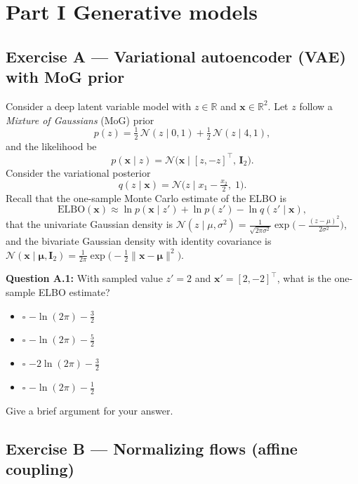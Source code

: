 \documentclass[12pt,a4paper]{article}
\newcommand{\N}{\mathcal{N}}
\newcommand{\ELBO}{\mathrm{ELBO}}
\begin{document}
\newpage
\section*{Part I \quad Generative models}

\subsection*{Exercise A --- Variational autoencoder (VAE) with MoG prior}

Consider a deep latent variable model with $z\in\mathbb{R}$ and $\mathbf{x}\in\mathbb{R}^2$.
Let $z$ follow a \emph{Mixture of Gaussians} (MoG) prior
\[
  p(z) = \tfrac{1}{2}\,\N(z\mid 0, 1) + \tfrac{1}{2}\,\N(z\mid 4, 1),
\]
and the likelihood be
\[
  p(\mathbf{x}\mid z) = \N\!\bigl(\mathbf{x}\mid [z, -z]^\top,\, \mathbf{I}_2\bigr).
\]
Consider the variational posterior
\[
  q(z\mid\mathbf{x}) = \N\!\bigl(z\mid x_1 - \tfrac{x_2}{2},\; 1\bigr).
\]
Recall that the one-sample Monte Carlo estimate of the ELBO is
\[
  \ELBO(\mathbf{x}) \approx \ln p(\mathbf{x}\mid z') + \ln p(z') - \ln q(z'\mid\mathbf{x}), \tag{1}
\]
that the univariate Gaussian density is
$\N(z\mid\mu,\sigma^2) = \tfrac{1}{\sqrt{2\pi\sigma^2}}\exp\!\bigl(-\tfrac{(z-\mu)^2}{2\sigma^2}\bigr)$,
and the bivariate Gaussian density with identity covariance is
$\N(\mathbf{x}\mid\boldsymbol{\mu},\mathbf{I}_2) = \tfrac{1}{2\pi}\exp\!\bigl(-\tfrac{1}{2}\|\mathbf{x}-\boldsymbol{\mu}\|^2\bigr)$.

\textbf{Question A.1:} With sampled value $z'=2$ and $\mathbf{x}'=[2,-2]^\top$, what is the
one-sample ELBO estimate?

\begin{itemize}[noitemsep,label={}]
  \item[\textbf{A}] $\square$ \quad $-\ln(2\pi) - \tfrac{3}{2}$
  \item[\textbf{B}] $\square$ \quad $-\ln(2\pi) - \tfrac{5}{2}$
  \item[\textbf{C}] $\square$ \quad $-2\ln(2\pi) - \tfrac{3}{2}$
  \item[\textbf{D}] $\square$ \quad $-\ln(2\pi) - \tfrac{1}{2}$
\end{itemize}

Give a brief argument for your answer.

\vspace{6cm}

\newpage
\subsection*{Exercise B --- Normalizing flows (affine coupling)}
\end{document}
